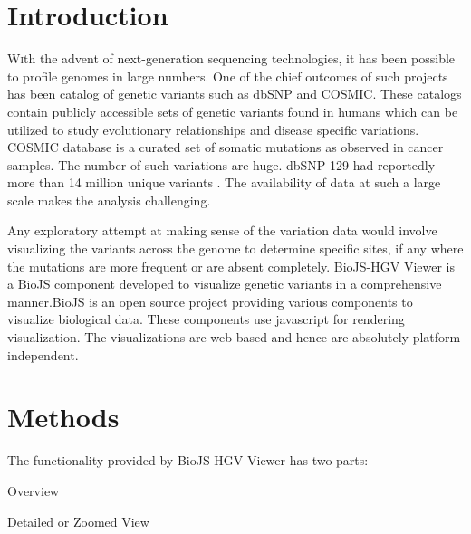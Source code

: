 \documentclass[twoside]{article}
\begin{document}
\begin{multicols}{2} %

\section{Introduction}

\lettrine[nindent=0em,lines=3]{W} 
ith the advent of next-generation sequencing technologies, it has been possible to profile genomes in large numbers. One of the chief outcomes of such projects has been catalog of genetic variants such as dbSNP\cite{Smigielski2000} and COSMIC\cite{Forbes2011}. These catalogs contain publicly accessible sets of genetic variants found in humans which can be utilized to  study evolutionary relationships and disease specific variations. COSMIC database is a curated set of somatic mutations as observed in cancer samples. The number of such variations are   huge. dbSNP 129 had reportedly more than 14 million unique variants \cite{ncbiweb}. The availability of data at such a large scale makes the analysis challenging.

Any exploratory attempt at making sense of the variation data would involve visualizing the variants across the genome to determine specific sites, if any where the mutations are more frequent or are absent completely. 
 BioJS-HGV Viewer is a BioJS \cite{Corpas2014} component developed to visualize genetic variants in a comprehensive manner.BioJS is an open source project providing various components to visualize biological data. These components use javascript for rendering visualization. The visualizations are web based and hence are absolutely platform independent.
 
 

\section{Methods}
The functionality provided by BioJS-HGV Viewer has two parts:\\
\begin{compactitem}
\item Overview
\item Detailed or Zoomed View
\end{compactitem}



\end{multicols}
\end{document}
